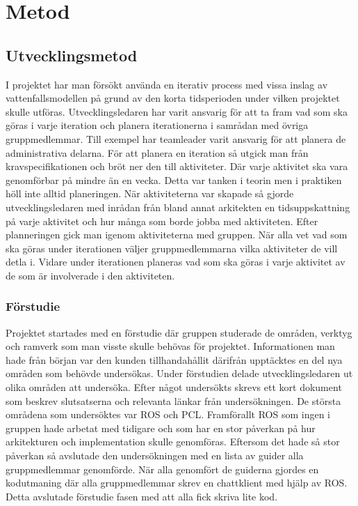 \chapter{Metod}
\label{cha:method}

\section{Utvecklingsmetod}


I projektet har man försökt använda en iterativ process med vissa inslag av vattenfallsmodellen på grund av den korta tidsperioden under vilken projektet skulle utföras. Utvecklingsledaren har varit ansvarig för att ta fram vad som ska göras i varje iteration och planera iterationerna i samrådan med övriga gruppmedlemmar. Till exempel har teamleader varit ansvarig för att planera de administrativa delarna. För att planera en iteration så utgick man från kravspecifikationen och bröt ner den till aktiviteter. Där varje aktivitet ska vara genomförbar på mindre än en vecka. Detta var tanken i teorin men i praktiken höll inte alltid planeringen. När aktiviteterna var skapade så gjorde utvecklingsledaren med inrådan från bland annat arkitekten en tidsuppskattning på varje aktivitet och hur många som borde jobba med aktiviteten. Efter planneringen gick man igenom aktiviteterna med gruppen. När alla vet vad som ska göras under iterationen väljer gruppmedlemmarna vilka aktiviteter de vill detla i. Vidare under iterationen planeras vad som ska göras i varje aktivitet av de som är involverade i den aktiviteten.

\subsection{Förstudie}

Projektet startades med en förstudie där gruppen studerade de områden, verktyg och ramverk som man visste skulle behövas för projektet. Informationen man hade från början var den kunden tillhandahållit därifrån upptäcktes en del nya områden som behövde undersökas. Under förstudien delade utvecklingsledaren ut olika områden att undersöka. Efter något undersökts skrevs ett kort dokument som beskrev slutsatserna och relevanta länkar från undersökningen. De största områdena som undersöktes var ROS och PCL. Framförallt ROS som ingen i gruppen hade arbetat med tidigare och som har en stor påverkan på hur arkitekturen och implementation skulle genomföras. Eftersom det hade så stor påverkan så avslutade den undersökningen med en lista av guider alla gruppmedlemmar genomförde. När alla genomfört de guiderna gjordes en kodutmaning där alla gruppmedlemmar skrev en chattklient med hjälp av ROS. Detta avslutade förstudie fasen med att alla fick skriva lite kod. 

